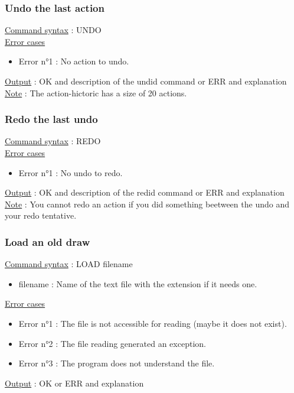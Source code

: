 \documentclass[a4paper, 12pts]{article}
\begin{document}
		\subsubsection{Undo the last action}
			\uline{Command syntax} :
			UNDO\\
			\uline{Error cases}
			\begin{itemize}
				\item Error n°1 : No action to undo.
			\end{itemize}
			\uline{Output} : OK and description of the undid command or ERR and explanation\\
			\uline{Note} : 
			The action-hictoric has a size of 20 actions.

		\subsubsection{Redo the last undo}
			\uline{Command syntax} :
			REDO\\
			\uline{Error cases}
			\begin{itemize}
				\item Error n°1 : No undo to redo.
			\end{itemize}
			\uline{Output} : OK and description of the redid command or ERR and explanation\\
			\uline{Note} : 
			You cannot redo an action if you did something beetween the undo and your redo tentative.

		\subsubsection{Load an old draw}
			\uline{Command syntax} :
			LOAD filename
			\begin{itemize}
				\item filename : Name of the text file with the extension if it needs one.
			\end{itemize}
			\uline{Error cases}
			\begin{itemize}
				\item Error n°1 : The file is not accessible for reading (maybe it does not exist).
				\item Error n°2 : The file reading generated an exception.
				\item Error n°3 : The program does not understand the file.
			\end{itemize}
			\uline{Output} : OK or ERR and explanation\\
\end{document}
